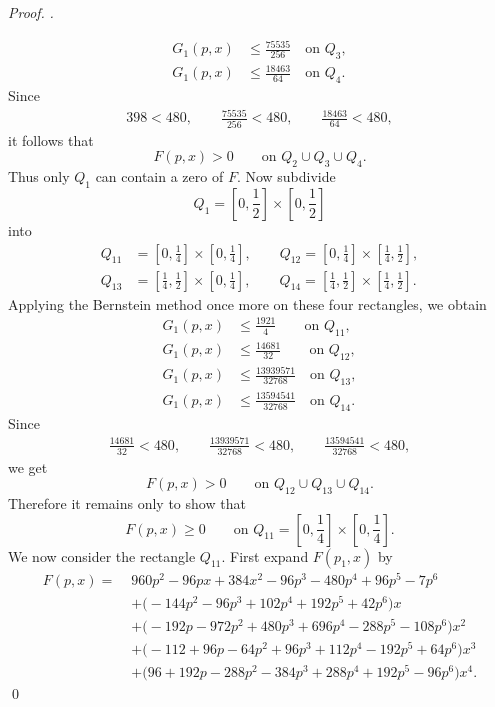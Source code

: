 \documentclass[a4paper,12pt,reqno]{amsart} %
\numberwithin{equation}{section}
\theoremstyle{definition}
\newenvironment{pf}[1][]{%
	\vskip 3mm
	\noindent
	\ifthenelse{\equal{#1}{}}%
	{{\slshape Proof. }}%
	{{\slshape #1.} }%
}%
{\qed\bigskip}
\begin{document}
\begin{pf}
\begin{align*}
G_1(p,x) &\le \frac{75535}{256} \quad \text{on } Q_3,\\[2mm]
G_1(p,x) &\le \frac{18463}{64} \quad \text{on } Q_4.
\end{align*}
Since
\begin{align*}
398<480,\qquad \frac{75535}{256}<480,\qquad \frac{18463}{64}<480,
\end{align*}
it follows that
\[
F(p,x)>0
\qquad \text{on }Q_2\cup Q_3\cup Q_4.
\]
Thus only $Q_{1}$ can contain a zero of $F$.
Now subdivide
\[
Q_1=\left[0,\frac12\right]\times\left[0,\frac12\right]
\]
into
\begin{align*}
Q_{11}&=\left[0,\frac14\right]\times\left[0,\frac14\right],\qquad
Q_{12}=\left[0,\frac14\right]\times\left[\frac14,\frac12\right],\\[3mm]
Q_{13}&=\left[\frac14,\frac12\right]\times\left[0,\frac14\right],\qquad
Q_{14}=\left[\frac14,\frac12\right]\times\left[\frac14,\frac12\right].
\end{align*}
Applying the Bernstein method once more on these four rectangles, we obtain
\begin{align*}
G_1(p,x) &\le \frac{1921}{4} \qquad \text{on } Q_{11},\\[2mm]
G_1(p,x) &\le \frac{14681}{32} \qquad \text{on } Q_{12},\\[2mm]
G_1(p,x) &\le \frac{13939571}{32768} \quad \text{on } Q_{13},\\[2mm]
G_1(p,x) &\le \frac{13594541}{32768} \quad \text{on } Q_{14}.
\end{align*}
Since
\begin{align*}
\frac{14681}{32}<480,\qquad
\frac{13939571}{32768}<480,\qquad
\frac{13594541}{32768}<480,
\end{align*}
we get
\[
F(p,x)>0
\qquad \text{on }Q_{12}\cup Q_{13}\cup Q_{14}.
\]
Therefore it remains only to show that
\[
F(p,x)\ge 0
\qquad \text{on }Q_{11}=\left[0,\frac14\right]\times\left[0,\frac14\right].
\]
We now consider the rectangle $Q_{11}$.
First expand $F(p_1, x)$ by 
\[
\begin{aligned}
F(p,x)=\;&960p^2-96px+384x^2 -96p^3-480p^4+96p^5-7p^6 \\
&+\bigl(-144p^2-96p^3+102p^4+192p^5+42p^6\bigr)x \\
&+\bigl(-192p-972p^2+480p^3+696p^4-288p^5-108p^6\bigr)x^2 \\
&+\bigl(-112+96p-64p^2+96p^3+112p^4-192p^5+64p^6\bigr)x^3 \\
&+\bigl(96+192p-288p^2-384p^3+288p^4+192p^5-96p^6\bigr)x^4.
\end{aligned}
\]
\end{pf}
\end{document}
